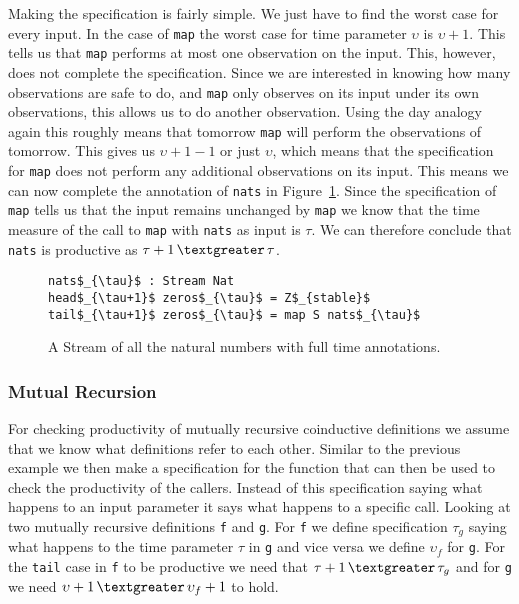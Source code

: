 Making the specification is fairly simple. We just have to find the worst case for every input. In the case of \texttt{map} the worst case for time parameter $\upsilon$ is $\upsilon+1$. This tells us that \texttt{map} performs at most one observation on the input. This, however, does not complete the specification. Since we are interested in knowing how many observations are safe to do, and \texttt{map} only observes on its input under its own observations, this allows us to do another observation. Using the day analogy again this roughly means that tomorrow \texttt{map} will perform the observations of tomorrow. This gives us $\upsilon+1-1$ or just $\upsilon$, which means that the specification for \texttt{map} does not perform any additional observations on its input. This means we can now complete the annotation of \texttt{nats} in Figure~\ref{fig:natsComplete}. Since the specification of \texttt{map} tells us that the input remains unchanged by \texttt{map} we know that the time measure of the call to \texttt{map} with \texttt{nats} as input is $\tau$. We can therefore conclude that \texttt{nats} is productive as $\tau+1\,\textgreater\,\tau$.

\begin{figure}
\begin{Verbatim}[commandchars=\\\{\},codes={\catcode`$=3\catcode`_=8}]
nats$_{\tau}$ : Stream Nat
head$_{\tau+1}$ zeros$_{\tau}$ = Z$_{stable}$
tail$_{\tau+1}$ zeros$_{\tau}$ = map S nats$_{\tau}$
\end{Verbatim}
\caption{A Stream of all the natural numbers with full time annotations.}
\label{fig:natsComplete}
\end{figure}

\subsubsection{Mutual Recursion}
For checking productivity of mutually recursive coinductive definitions we assume that we know what definitions refer to each other. Similar to the previous example we then make a specification for the function that can then be used to check the productivity of the callers. Instead of this specification saying what happens to an input parameter it says what happens to a specific call. Looking at two mutually recursive definitions \texttt{f} and \texttt{g}. For \texttt{f} we define specification $\tau_{g}$ saying what happens to the time parameter $\tau$ in \texttt{g} and vice versa we define $\upsilon_{f}$ for \texttt{g}. For the \texttt{tail} case in \texttt{f} to be productive we need that $\tau+1\,\textgreater\,\tau_{g}$ and for \texttt{g} we need $\upsilon+1\,\textgreater\,\upsilon_{f}+1$ to hold.

